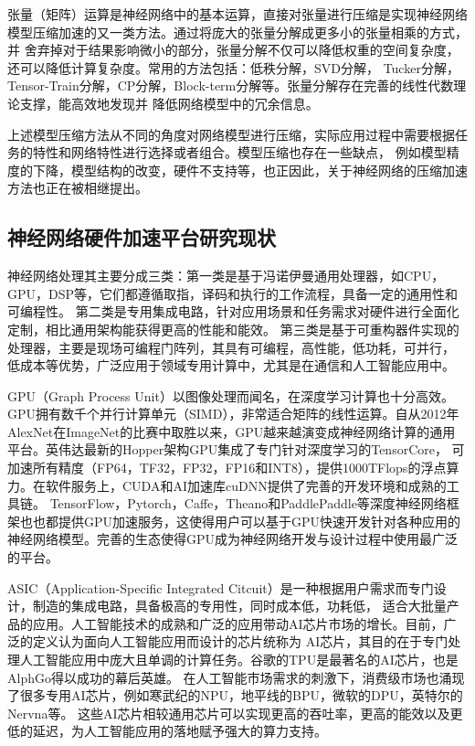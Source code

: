 张量（矩阵）运算是神经网络中的基本运算，直接对张量进行压缩是实现神经网络模型压缩加速的又一类方法。通过将庞大的张量分解成更多小的张量相乘的方式，并
舍弃掉对于结果影响微小的部分，张量分解不仅可以降低权重的空间复杂度，还可以降低计算复杂度。常用的方法包括：低秩分解，SVD分解，
Tucker分解，Tensor-Train分解，CP分解，Block-term分解等。张量分解存在完善的线性代数理论支撑，能高效地发现并
降低网络模型中的冗余信息。

上述模型压缩方法从不同的角度对网络模型进行压缩，实际应用过程中需要根据任务的特性和网络特性进行选择或者组合。模型压缩也存在一些缺点，
例如模型精度的下降，模型结构的改变，硬件不支持等，也正因此，关于神经网络的压缩加速方法也正在被相继提出。

\subsection{神经网络硬件加速平台研究现状}
神经网络处理其主要分成三类：第一类是基于冯诺伊曼通用处理器，如CPU，GPU，DSP等，它们都遵循取指，译码和执行的工作流程，具备一定的通用性和可编程性。
第二类是专用集成电路，针对应用场景和任务需求对硬件进行全面化定制，相比通用架构能获得更高的性能和能效。
第三类是基于可重构器件实现的处理器，主要是现场可编程门阵列，其具有可编程，高性能，低功耗，可并行，
低成本等优势，广泛应用于领域专用计算中，尤其是在通信和人工智能应用中。

GPU（Graph Process Unit）以图像处理而闻名，在深度学习计算也十分高效。GPU拥有数千个并行计算单元（SIMD），非常适合矩阵的线性运算。自从2012年
AlexNet在ImageNet的比赛中取胜以来，GPU越来越演变成神经网络计算的通用平台。英伟达最新的Hopper架构GPU集成了专门针对深度学习的TensorCore，
可加速所有精度（FP64，TF32，FP32，FP16和INT8），提供1000TFlops的浮点算力。在软件服务上，CUDA和AI加速库cuDNN提供了完善的开发环境和成熟的工具链。
TensorFlow，Pytorch，Caffe，Theano和PaddlePaddle等深度神经网络框架也也都提供GPU加速服务，这使得用户可以基于GPU快速开发针对各种应用的
神经网络模型。完善的生态使得GPU成为神经网络开发与设计过程中使用最广泛的平台。

ASIC（Application-Specific Integrated Citcuit）是一种根据用户需求而专门设计，制造的集成电路，具备极高的专用性，同时成本低，功耗低，
适合大批量产品的应用。人工智能技术的成熟和广泛的应用带动AI芯片市场的增长。目前，广泛的定义认为面向人工智能应用而设计的芯片统称为
AI芯片，其目的在于专门处理人工智能应用中庞大且单调的计算任务。谷歌的TPU是最著名的AI芯片，也是AlphGo得以成功的幕后英雄。
在人工智能市场需求的刺激下，消费级市场也涌现了很多专用AI芯片，例如寒武纪的NPU，地平线的BPU，微软的DPU，英特尔的Nervna等。
这些AI芯片相较通用芯片可以实现更高的吞吐率，更高的能效以及更低的延迟，为人工智能应用的落地赋予强大的算力支持。

